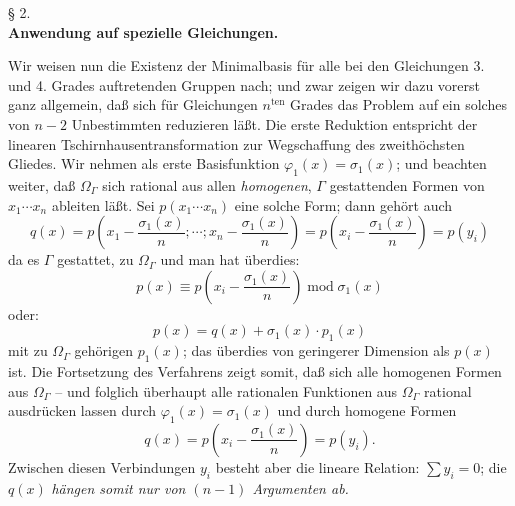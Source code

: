 \begin{center}
§ 2.\\[0.75em]
\textbf{Anwendung auf spezielle Gleichungen.}
\end{center}

Wir weisen nun die Existenz der Minimalbasis für alle bei den Gleichungen 3. und 4. Grades auftretenden Gruppen nach; und zwar zeigen wir dazu vorerst ganz allgemein, daß sich für Gleichungen $n^{\text{ten}}$ Grades das Problem auf ein solches von $n-2$ Unbestimmten reduzieren läßt. Die erste Reduktion entspricht der linearen Tschirnhausentransformation zur Wegschaffung des zweithöchsten Gliedes. Wir nehmen als erste Basisfunktion $\varphi_1(x)=\sigma_1(x)$; und beachten weiter, daß $\Omega_\Gamma$ sich rational aus allen \emph{homogenen}, $\Gamma$ gestattenden Formen von $x_1\cdots x_n$ ableiten läßt. Sei $p(x_1\cdots x_n)$ eine solche Form; dann gehört auch
\[
q(x)=p\left(x_1-\frac{\sigma_1(x)}{n};\cdots;x_n-\frac{\sigma_1(x)}{n}\right)=p\left(x_i-\frac{\sigma_1(x)}{n}\right)=p(y_i)
\]
da es $\Gamma$ gestattet, zu $\Omega_\Gamma$ und man hat überdies:
\[
p(x)\equiv p\left(x_i-\frac{\sigma_1(x)}{n}\right)\operatorname{mod}\sigma_1(x)
\]
oder:
\[
p(x)=q(x)+\sigma_1(x)\cdot p_1(x)
\]
mit zu $\Omega_\Gamma$ gehörigen $p_1(x)$; das überdies von geringerer Dimension als $p(x)$ ist. Die Fortsetzung des Verfahrens zeigt somit, daß sich alle homogenen Formen aus $\Omega_\Gamma$ -- und folglich überhaupt alle rationalen Funktionen aus $\Omega_\Gamma$ rational ausdrücken lassen durch $\varphi_1(x)=\sigma_1(x)$ und durch homogene Formen
\[
q(x)=p\left(x_i-\frac{\sigma_1(x)}{n}\right)=p(y_i).
\]
Zwischen diesen Verbindungen $y_i$ besteht aber die lineare Relation: $\sum y_i=0$; die $q(x)$ \emph{hängen somit nur von $(n-1)$ Argumenten ab.}

